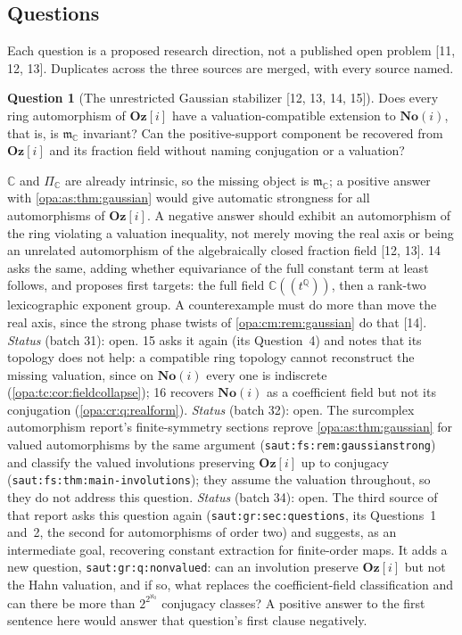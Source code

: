 \documentclass[11pt,oneside]{article}
\numberwithin{equation}{section}
\theoremstyle{definition}
\newtheorem{question}[question]{Question}
\theoremstyle{remark}
\newcommand{\Og}{\mathbf{Oz}[i]}
\newcommand{\SC}{\mathbf{No}(i)}
\newcommand{\C}{\mathbb C}
\newcommand{\Q}{\mathbb Q}
\newcommand{\mm}{\mathfrak m}
\newcommand{\Hahn}[2]{#1((t^{#2}))}
\newcommand{\src}[1]{\textup{\textsf{\small[#1]}}}
\newcommand{\lbl}[1]{\nolinkurl{#1}}
\begin{document}
\subsection{Questions}\label{opa:as:sub:questions}

Each question is a proposed research direction, not a published open problem \src{11, 12, 13}. Duplicates across
the three sources are merged, with every source named.

\begin{question}[The unrestricted Gaussian stabilizer \src{12, 13, 14, 15}]\label{opa:as:q:gaussian}
Does every ring automorphism of $\Og$ have a valuation-compatible extension to $\SC$, that is, is $\mm_\C$
invariant? Can the positive-support component be recovered from $\Og$ and its fraction field without naming
conjugation or a valuation?
\end{question}
$\C$ and $\Pi_\C$ are already intrinsic, so the missing object is $\mm_\C$; a positive answer with
\cref{opa:as:thm:gaussian} would give automatic strongness for all automorphisms of $\Og$. A negative answer
should exhibit an automorphism of the ring violating a valuation inequality, not merely moving the real axis or
being an unrelated automorphism of the algebraically closed fraction field \src{12, 13}. 14 asks the same, adding
whether equivariance of the full constant term at least follows, and proposes first targets: the full field
$\Hahn\C\Q$, then a rank-two lexicographic exponent group. A counterexample must do more than move the real axis,
since the strong phase twists of \cref{opa:cm:rem:gaussian} do that \src{14}. \emph{Status} (batch 31): open.
15 asks it again (its Question~4) and notes that its topology does not help: a compatible ring topology cannot
reconstruct the missing valuation, since on $\SC$ every one is indiscrete (\cref{opa:tc:cor:fieldcollapse});
16 recovers $\SC$ as a coefficient field but not its conjugation (\cref{opa:cr:q:realform}). \emph{Status}
(batch 32): open. The surcomplex automorphism report's finite-symmetry sections reprove \cref{opa:as:thm:gaussian}
for valued automorphisms by the same argument (\lbl{saut:fs:rem:gaussianstrong}) and classify the valued involutions
preserving $\Og$ up to conjugacy (\lbl{saut:fs:thm:main-involutions}); they assume the valuation throughout, so
they do not address this question. \emph{Status} (batch 34): open. The third source of that report asks this
question again (\lbl{saut:gr:sec:questions}, its Questions~1 and~2, the second for automorphisms of order two) and
suggests, as an intermediate goal, recovering constant extraction for finite-order maps. It adds a new question,
\lbl{saut:gr:q:nonvalued}: can an involution preserve $\Og$ but not the Hahn valuation, and if so, what replaces the
coefficient-field classification and can there be more than $2^{2^{\aleph_0}}$ conjugacy classes? A positive answer to the
first sentence here would answer that question's first clause negatively.
\end{document}
